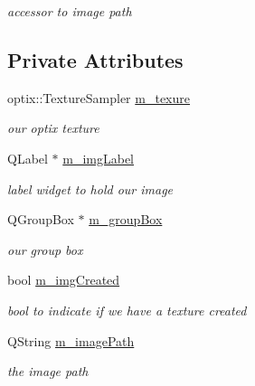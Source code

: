 \begin{DoxyCompactItemize}
\begin{DoxyCompactList}\small\item\em accessor to image path \end{DoxyCompactList}\end{DoxyCompactItemize}
\subsection*{Private Attributes}
\begin{DoxyCompactItemize}
\item 
\hypertarget{class_image_node_proxy_widget_a6addc0eef24e9bc9b010eca29c126943}{optix\-::\-Texture\-Sampler \hyperlink{class_image_node_proxy_widget_a6addc0eef24e9bc9b010eca29c126943}{m\-\_\-texure}}\label{class_image_node_proxy_widget_a6addc0eef24e9bc9b010eca29c126943}

\begin{DoxyCompactList}\small\item\em our optix texture \end{DoxyCompactList}\item 
\hypertarget{class_image_node_proxy_widget_aede65813ea9649a733fb03226082fc54}{Q\-Label $\ast$ \hyperlink{class_image_node_proxy_widget_aede65813ea9649a733fb03226082fc54}{m\-\_\-img\-Label}}\label{class_image_node_proxy_widget_aede65813ea9649a733fb03226082fc54}

\begin{DoxyCompactList}\small\item\em label widget to hold our image \end{DoxyCompactList}\item 
\hypertarget{class_image_node_proxy_widget_a2bbc7434a8db9f8e49937968fcc1e5fe}{Q\-Group\-Box $\ast$ \hyperlink{class_image_node_proxy_widget_a2bbc7434a8db9f8e49937968fcc1e5fe}{m\-\_\-group\-Box}}\label{class_image_node_proxy_widget_a2bbc7434a8db9f8e49937968fcc1e5fe}

\begin{DoxyCompactList}\small\item\em our group box \end{DoxyCompactList}\item 
\hypertarget{class_image_node_proxy_widget_a6db30ded674d54f7b39fa5c4ffb5af26}{bool \hyperlink{class_image_node_proxy_widget_a6db30ded674d54f7b39fa5c4ffb5af26}{m\-\_\-img\-Created}}\label{class_image_node_proxy_widget_a6db30ded674d54f7b39fa5c4ffb5af26}

\begin{DoxyCompactList}\small\item\em bool to indicate if we have a texture created \end{DoxyCompactList}\item 
\hypertarget{class_image_node_proxy_widget_a90f807adc849eea5050763eb6a849f4e}{Q\-String \hyperlink{class_image_node_proxy_widget_a90f807adc849eea5050763eb6a849f4e}{m\-\_\-image\-Path}}\label{class_image_node_proxy_widget_a90f807adc849eea5050763eb6a849f4e}

\begin{DoxyCompactList}\small\item\em the image path \end{DoxyCompactList}\end{DoxyCompactItemize}
